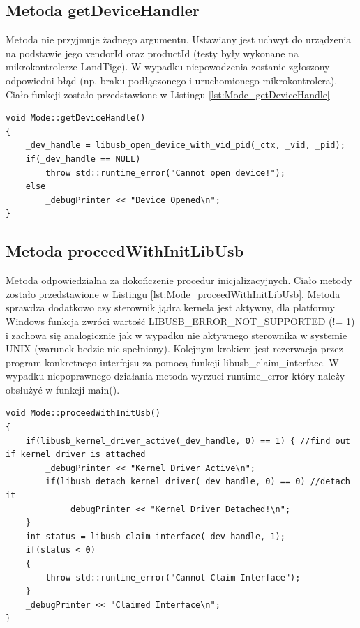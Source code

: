 \documentclass{BscUS}
\begin{document}
\subsection{Metoda getDeviceHandler}
Metoda nie przyjmuje żadnego argumentu. Ustawiany jest uchwyt do urządzenia na podstawie jego vendorId oraz productId (testy były wykonane na mikrokontrolerze LandTige). W wypadku niepowodzenia zostanie zgłoszony odpowiedni błąd (np. braku podłączonego i uruchomionego mikrokontrolera).
Ciało funkcji zostało przedstawione w Listingu \ref{lst:Mode_getDeviceHandle}
\begin{lstlisting}[caption={Metoda Mode::getDeviceHandler()},label={lst:Mode_getDeviceHandle}]
void Mode::getDeviceHandle()
{
	_dev_handle = libusb_open_device_with_vid_pid(_ctx, _vid, _pid);
	if(_dev_handle == NULL)
		throw std::runtime_error("Cannot open device!");
	else
		_debugPrinter << "Device Opened\n";
}
\end{lstlisting}
\subsection{Metoda proceedWithInitLibUsb}
Metoda odpowiedzialna za dokończenie procedur inicjalizacyjnych. Ciało metody zostało przedstawione w Listingu \ref{lst:Mode_proceedWithInitLibUsb}. Metoda sprawdza dodatkowo czy sterownik jądra kernela jest aktywny, dla platformy Windows funkcja zwróci wartość LIBUSB\_ERROR\_NOT\_SUPPORTED (!= 1) i zachowa się analogicznie jak w wypadku nie aktywnego sterownika w systemie UNIX (warunek bedzie nie spełniony).
\newline
Kolejnym krokiem jest rezerwacja przez program konkretnego interfejsu za pomocą funkcji libusb\_claim\_interface.
\newline
W wypadku niepoprawnego działania metoda wyrzuci runtime\_error który należy obsłużyć  w funkcji main().
\begin{lstlisting}[caption={Metoda Mode::proceedWithInitLibUsb()},label={lst:Mode_proceedWithInitLibUsb}]
void Mode::proceedWithInitUsb()
{
	if(libusb_kernel_driver_active(_dev_handle, 0) == 1) { //find out if kernel driver is attached
		_debugPrinter << "Kernel Driver Active\n";
		if(libusb_detach_kernel_driver(_dev_handle, 0) == 0) //detach it
			_debugPrinter << "Kernel Driver Detached!\n";
	}
	int status = libusb_claim_interface(_dev_handle, 1);
	if(status < 0) 
	{
		throw std::runtime_error("Cannot Claim Interface");
	}
	_debugPrinter << "Claimed Interface\n";
}
\end{lstlisting}
\end{document}
